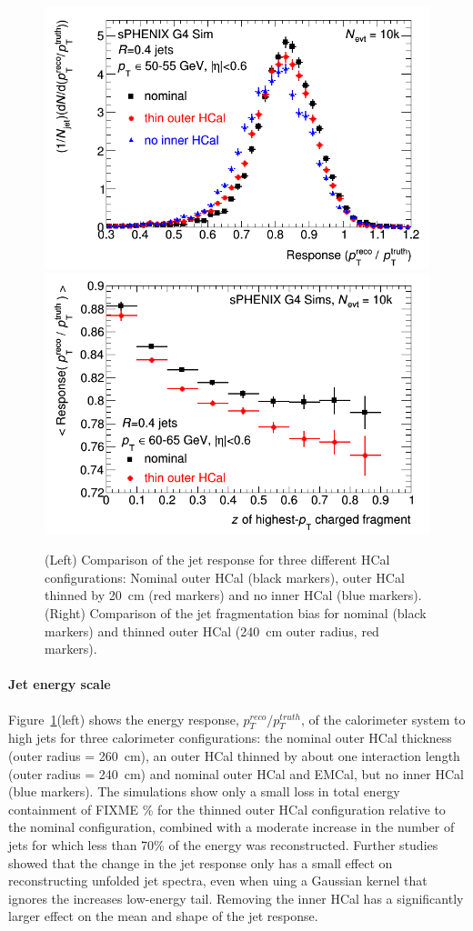 \begin{figure}[hbt]
  \centering
  \includegraphics[width=0.4\linewidth]{figs/jetresponse_thinhcal}
  \hspace{0.1\linewidth}
  \includegraphics[width=0.4\linewidth]{figs/fragmentation_bias_thinhcal}
  \caption{(Left) Comparison of the jet response for three different HCal configurations: Nominal outer HCal (black markers), 
   outer HCal thinned by 20~cm (red markers) and no inner HCal (blue markers). 
   (Right) Comparison of the jet fragmentation bias for nominal (black markers) and thinned outer HCal (240~cm outer radius, red markers).}
  \label{fig:jet_energy_scale_thin_hcal}
\end{figure}
\paragraph{Jet energy scale}
Figure~\ref{fig:jet_energy_scale_thin_hcal}(left) shows the energy response, $p_T^{reco}/p_T^{truth}$, 
of the calorimeter system to high \pT jets for 
three calorimeter configurations: the nominal outer HCal thickness (outer radius = 260~cm), an outer HCal thinned by about one 
interaction length (outer radius = 240~cm) and nominal outer HCal and EMCal, but no inner HCal (blue markers). The simulations 
show only a small loss in total energy containment of FIXME \% for the thinned outer HCal configuration relative to the nominal
configuration, combined with a moderate increase in the number of jets for which less than 70\% of the energy was reconstructed.
Further studies showed that the change in the jet response only has a small effect on reconstructing unfolded jet spectra,
even when uing a Gaussian kernel that ignores the increases low-energy tail. Removing the inner HCal has a significantly larger
effect on the mean and shape of the jet response.

